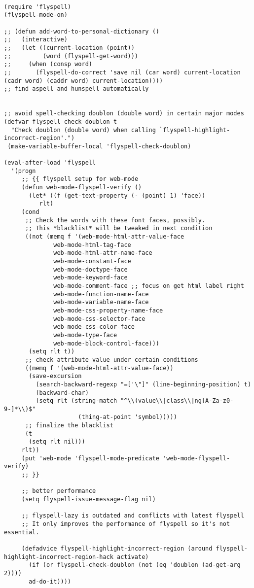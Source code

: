 \documentclass[11pt]{article}
\begin{document}
\begin{verbatim}

(require 'flyspell)
(flyspell-mode-on)

;; (defun add-word-to-personal-dictionary ()
;;   (interactive)
;;   (let ((current-location (point))
;;         (word (flyspell-get-word)))
;;     (when (consp word)
;;       (flyspell-do-correct 'save nil (car word) current-location (cadr word) (caddr word) current-location)))) 
;; find aspell and hunspell automatically


;; avoid spell-checking doublon (double word) in certain major modes
(defvar flyspell-check-doublon t
  "Check doublon (double word) when calling `flyspell-highlight-incorrect-region'.")
 (make-variable-buffer-local 'flyspell-check-doublon)

(eval-after-load 'flyspell
  '(progn
     ;; {{ flyspell setup for web-mode
     (defun web-mode-flyspell-verify ()
       (let* ((f (get-text-property (- (point) 1) 'face))
	      rlt)
	 (cond
	  ;; Check the words with these font faces, possibly.
	  ;; This *blacklist* will be tweaked in next condition
	  ((not (memq f '(web-mode-html-attr-value-face
			  web-mode-html-tag-face
			  web-mode-html-attr-name-face
			  web-mode-constant-face
			  web-mode-doctype-face
			  web-mode-keyword-face
			  web-mode-comment-face ;; focus on get html label right
			  web-mode-function-name-face
			  web-mode-variable-name-face
			  web-mode-css-property-name-face
			  web-mode-css-selector-face
			  web-mode-css-color-face
			  web-mode-type-face
			  web-mode-block-control-face)))
	   (setq rlt t))
	  ;; check attribute value under certain conditions
	  ((memq f '(web-mode-html-attr-value-face))
	   (save-excursion
	     (search-backward-regexp "=['\"]" (line-beginning-position) t)
	     (backward-char)
	     (setq rlt (string-match "^\\(value\\|class\\|ng[A-Za-z0-9-]*\\)$"
				     (thing-at-point 'symbol)))))
	  ;; finalize the blacklist
	  (t
	   (setq rlt nil)))
	 rlt))
     (put 'web-mode 'flyspell-mode-predicate 'web-mode-flyspell-verify)
     ;; }}

     ;; better performance
     (setq flyspell-issue-message-flag nil)

     ;; flyspell-lazy is outdated and conflicts with latest flyspell
     ;; It only improves the performance of flyspell so it's not essential.

     (defadvice flyspell-highlight-incorrect-region (around flyspell-highlight-incorrect-region-hack activate)
       (if (or flyspell-check-doublon (not (eq 'doublon (ad-get-arg 2))))
	   ad-do-it))))



\end{verbatim}
\end{document}
